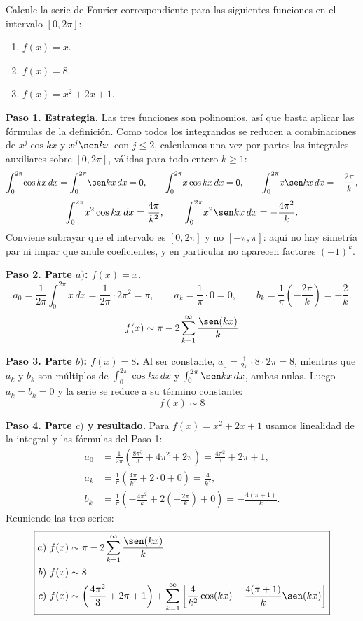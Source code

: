 \begin{example}
Calcule la serie de Fourier correspondiente para las siguientes funciones en el intervalo $\left[ 0,2\pi \right]$:
\begin{enumerate}[$a)$]
\item $f(x)=x.$
\item $f(x)=8.$
\item $f(x)=x^2+2x+1.$
\end{enumerate}
\begin{myproof}
\textbf{Paso 1. Estrategia.} Las tres funciones son polinomios, así que basta aplicar las fórmulas de la definición. Como todos los integrandos se reducen a combinaciones de $x^j\cos kx$ y $x^j\sen kx$ con $j \leq 2$, calculamos una vez por partes las integrales auxiliares sobre $[0,2\pi]$, válidas para todo entero $k \geq 1$:
\[
\int_0^{2\pi}\! \cos kx\,dx = \int_0^{2\pi}\! \sen kx\,dx = 0, \qquad
\int_0^{2\pi}\! x\cos kx\,dx = 0, \qquad
\int_0^{2\pi}\! x\sen kx\,dx = -\frac{2\pi}{k},
\]
\[
\int_0^{2\pi}\! x^2\cos kx\,dx = \frac{4\pi}{k^2}, \qquad
\int_0^{2\pi}\! x^2\sen kx\,dx = -\frac{4\pi^2}{k}.
\]
Conviene subrayar que el intervalo es $[0,2\pi]$ y no $[-\pi,\pi]$: aquí no hay simetría par ni impar que anule coeficientes, y en particular no aparecen factores $(-1)^k$.

\textbf{Paso 2. Parte $a)$: $f(x)=x$.}
\[
a_0 = \frac{1}{2\pi}\int_0^{2\pi}\! x\,dx = \frac{1}{2\pi}\cdot 2\pi^2 = \pi, \qquad
a_k = \frac{1}{\pi}\cdot 0 = 0, \qquad
b_k = \frac{1}{\pi}\left(-\frac{2\pi}{k}\right) = -\frac{2}{k}.
\]
\[
f(x) \sim \pi - 2 \sum_{k=1}^{\infty} \frac{\sen(kx)}{k}
\]

\textbf{Paso 3. Parte $b)$: $f(x)=8$.} Al ser constante, $a_0 = \frac{1}{2\pi}\cdot 8 \cdot 2\pi = 8$, mientras que $a_k$ y $b_k$ son múltiplos de $\int_0^{2\pi}\cos kx\,dx$ y $\int_0^{2\pi}\sen kx\,dx$, ambas nulas. Luego $a_k = b_k = 0$ y la serie se reduce a su término constante:
\[
f(x) \sim 8
\]

\textbf{Paso 4. Parte $c)$ y resultado.} Para $f(x)=x^2+2x+1$ usamos linealidad de la integral y las fórmulas del Paso 1:
\begin{align*}
a_0 &= \frac{1}{2\pi}\left( \frac{8\pi^3}{3} + 4\pi^2 + 2\pi \right) = \frac{4\pi^2}{3} + 2\pi + 1, \\
a_k &= \frac{1}{\pi}\left( \frac{4\pi}{k^2} + 2\cdot 0 + 0 \right) = \frac{4}{k^2}, \\
b_k &= \frac{1}{\pi}\left( -\frac{4\pi^2}{k} + 2\left(-\frac{2\pi}{k}\right) + 0 \right) = -\frac{4(\pi+1)}{k}.
\end{align*}
Reuniendo las tres series:
\[
\boxed{
\begin{aligned}
a)\ & f(x) \sim \pi - 2 \sum_{k=1}^{\infty} \frac{\sen(kx)}{k} \\
b)\ & f(x) \sim 8 \\
c)\ & f(x) \sim \left( \frac{4\pi^2}{3} + 2\pi + 1 \right) + \sum_{k=1}^{\infty} \left[ \frac{4}{k^2} \cos(kx) - \frac{4(\pi+1)}{k} \sen(kx) \right]
\end{aligned}
}
\]
\end{myproof}
\end{example}

